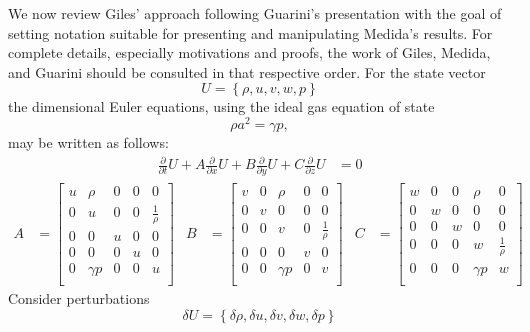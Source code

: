 \documentclass[letterpaper,11pt,nointlimits,reqno,draft]{amsart}
\begin{document}
We now review Giles' approach following Guarini's presentation with the goal of
setting notation suitable for presenting and manipulating Medida's results.
For complete details, especially motivations and proofs, the work of Giles,
Medida, and Guarini should be consulted in that respective order.  For the
state vector
$$
U = \left\{ \rho, u, v, w, p \right\}
$$
the dimensional Euler equations, using the ideal gas equation of state
$$
\rho a^2 = \gamma p,
$$
may be written as follows:
\begin{align}
    \frac{\partial}{\partial{}t}U
+ A \frac{\partial}{\partial{}x}U
+ B \frac{\partial}{\partial{}y}U
+ C \frac{\partial}{\partial{}z}U
&= 0
\end{align}
\begin{align}
 A &= \begin{bmatrix}
        u & \rho     & 0 & 0 & 0              \\
        0 & u        & 0 & 0 & \frac{1}{\rho} \\
        0 & 0        & u & 0 & 0              \\
        0 & 0        & 0 & u & 0              \\
        0 & \gamma p & 0 & 0 & u              \\
       \end{bmatrix}
&
 B &= \begin{bmatrix}
        v & 0 & \rho     & 0 & 0              \\
        0 & v & 0        & 0 & 0              \\
        0 & 0 & v        & 0 & \frac{1}{\rho} \\
        0 & 0 & 0        & v & 0              \\
        0 & 0 & \gamma p & 0 & v              \\
       \end{bmatrix}
&
 C &= \begin{bmatrix}
        w & 0 & 0 & \rho     & 0              \\
        0 & w & 0 & 0        & 0              \\
        0 & 0 & w & 0        & 0              \\
        0 & 0 & 0 & w        & \frac{1}{\rho} \\
        0 & 0 & 0 & \gamma p & w              \\
       \end{bmatrix}
\end{align}
Consider perturbations
$$
\delta{}U = \left\{ \delta{}\rho, \delta{}u,
\delta{}v, \delta{}w, \delta{}p \right\}
$$
\end{document}
